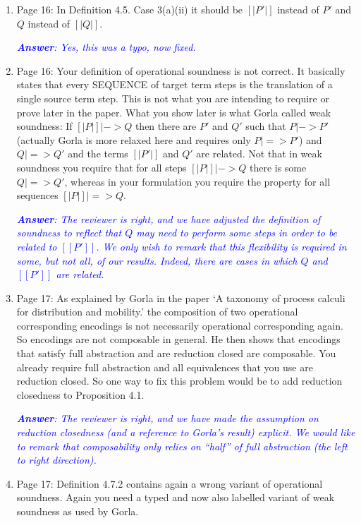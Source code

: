 \documentclass[11pt,a4paper]{article}
\newcommand{\answ}[1]{\smallskip \emph{\textcolor{blue}{\textbf{Answer}:  #1}}}
\newcommand{\checkthis}{}
\begin{document}
\begin{enumerate}
\item  Page 16: In Definition 4.5. Case 3(a)(ii) it should be $[|P'|] $ instead of $P'$
  and $Q$ instead of $[|Q|]$.
  
  \answ{Yes, this was a typo, now fixed.}
  
\item  Page 16: Your definition of operational soundness is not correct. It basically
  states that every SEQUENCE of target term steps is the translation of a single
  source term step. This is not what you are intending to require or prove later
  in the paper. 
  What you show later is what Gorla called weak soundness:
  If $[|P|] |-> Q$ then there are $P'$ and $Q'$ such that $P |-> P'$ (actually Gorla is
  more relaxed here and requires only $P |=> P'$) and $Q |=> Q'$ and the terms
  $[|P'|]$ and $Q'$ are related.
  Not that in weak soundness you require that for all steps $[|P|] |-> Q$ there
  is some $Q |=> Q'$, whereas in your formulation you require the property for all
  sequences $[|P|] |=> Q$.
  
  \answ{The reviewer is right, and we have adjusted the definition of soundness to reflect that $Q$ may need to perform some steps in order to be related to $[[P']]$. We only wish to remark that this flexibility is required in some, but not all, of our results. Indeed, there are cases in which $Q$ and $[[P']]$ are  related.} \checkthis
  
\item  Page 17: As explained by Gorla in the paper `A taxonomy of process calculi for
  distribution and mobility.' the composition of two operational corresponding
  encodings is not necessarily operational corresponding again. So encodings are
  not composable in general. He then shows that encodings that satisfy full
  abstraction and are reduction closed are composable. You already require full
  abstraction and all equivalences that you use are reduction closed. So one way
  to fix this problem would be to add reduction closedness to Proposition 4.1.
  
  \answ{The reviewer is right, and we have made the assumption on reduction closedness (and a reference to Gorla's result) explicit. We would like to remark that composability only relies on ``half'' of full abstraction (the left to right direction).} \checkthis
  
\item  Page 17: Definition 4.7.2 contains again a wrong variant of operational
  soundness. Again you need a typed and now also labelled variant of weak
  soundness as used by Gorla.
  

\end{enumerate}
\end{document}
